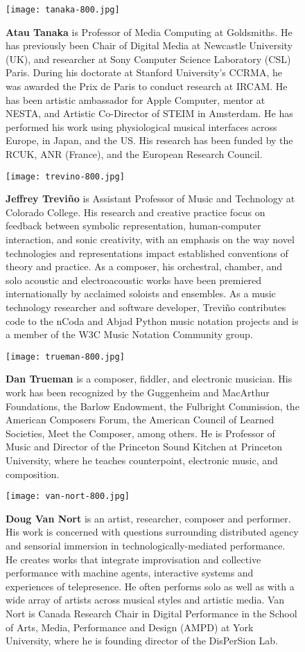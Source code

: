 \begin{authbio}
\begin{figure}[H]
  \sidecaption[t]
  \texttt{[image: tanaka-800.jpg]}
  \caption{\textbf{Atau Tanaka} is Professor of Media Computing at Goldsmiths. He has previously been Chair of Digital Media at Newcastle University (UK), and researcher at Sony Computer Science Laboratory (CSL) Paris. During his doctorate at Stanford University's CCRMA, he was awarded the Prix de Paris to conduct research at IRCAM. He has been artistic ambassador for Apple Computer, mentor at NESTA, and Artistic Co-Director of STEIM in Amsterdam. He has performed his work using physiological musical interfaces across Europe, in Japan, and the US. His research has been funded by the RCUK, ANR (France), and the European Research Council.}
\end{figure}

\begin{figure}[H]
  \sidecaption[t]
  \texttt{[image: trevino-800.jpg]}
  \caption{\textbf{Jeffrey Trevi\~no} is Assistant Professor of Music and Technology at Colorado College. His research and creative practice focus on feedback between symbolic representation, human-computer interaction, and sonic creativity, with an emphasis on the way novel technologies and representations impact established conventions of theory and practice. As a composer, his orchestral, chamber, and solo acoustic and electroacoustic works have been premiered internationally by acclaimed soloists and ensembles. As a music technology researcher and software developer, Trevi\~no contributes code to the nCoda and Abjad Python music notation projects and is a member of the W3C Music Notation Community group.}
\end{figure}

\begin{figure}[H]
  \sidecaption[t]
  \texttt{[image: trueman-800.jpg]}
  \caption{\textbf{Dan Trueman} is a composer, fiddler, and electronic musician. His work has been recognized by the Guggenheim and MacArthur Foundations, the Barlow Endowment, the Fulbright Commission, the American Composers Forum, the American Council of Learned Societies, Meet the Composer, among others. He is Professor of Music and Director of the Princeton Sound Kitchen at Princeton University, where he teaches counterpoint, electronic music, and composition.}
\end{figure}

\begin{figure}[H]
  \sidecaption[t]
  \texttt{[image: van-nort-800.jpg]}
  \caption{\textbf{Doug Van Nort} is an artist, researcher, composer and performer. His work is concerned with questions surrounding distributed agency and sensorial immersion in technologically-mediated performance. He creates works that integrate improvisation and collective performance with machine agents, interactive systems and experiences of telepresence. He often performs solo as well as with a wide array of artists across musical styles and artistic media. Van Nort is Canada Research Chair in Digital Performance in the School of Arts, Media, Performance and Design (AMPD) at York University, where he is founding director of the DisPerSion Lab.}
\end{figure}


\end{authbio}
